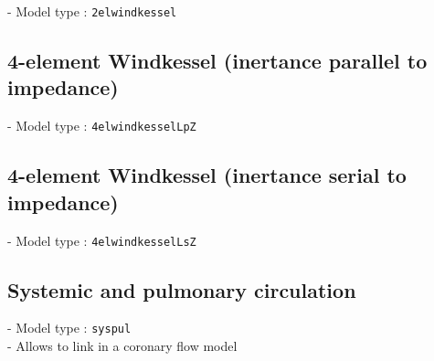 \documentclass[a4paper,12pt]{report}
\begin{document}
- Model type : \verb.2elwindkessel.\\

\subsection{4-element Windkessel (inertance parallel to impedance)}

- Model type : \verb.4elwindkesselLpZ.\\

\subsection{4-element Windkessel (inertance serial to impedance)}

- Model type : \verb.4elwindkesselLsZ.\\

\subsection{Systemic and pulmonary circulation}

- Model type : \verb.syspul.\\

- Allows to link in a coronary flow model
\end{document}
